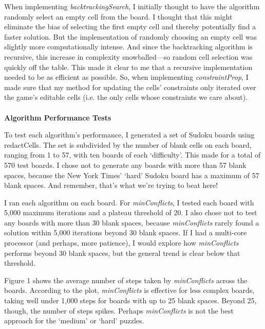 \documentclass[12pt]{article}
\begin{document}
	When implementing \textit{backtrackingSearch}, I initially thought to have the algorithm randomly select an empty cell from the board. I thought that this might eliminate the bias of selecting the first empty cell and thereby potentially find a faster solution. But the implementation of randomly choosing an empty cell was slightly more computationally intense. And since the backtracking algorithm is recursive, this increase in complexity snowballed---so random cell selection was quickly off the table. This made it clear to me that a recursive implementation needed to be as efficient as possible. So, when implementing \textit{constraintProp}, I made sure that my method for updating the cells' constraints only iterated over the game's editable cells (i.e. the only cells whose constraints we care about).\\\\
\textbf{Algorithm Performance Tests}
	
	To test each algorithm's performance, I generated a set of Sudoku boards using redactCells. The set is subdivided by the number of blank cells on each board, ranging from 1 to 57, with ten boards of each `difficulty'. This made for a total of 570 test boards. I chose not to generate any boards with more than 57 blank spaces, because the New York Times' `hard' Sudoku board has a maximum of 57 blank spaces. And remember, that's what we're trying to beat here!
	
	I ran each algorithm on each board. For \textit{minConflicts}, I tested each board with 5,000 maximum iterations and a plateau threshold of 20. I also chose not to test any boards with more than 30 blank spaces, because \textit{minConflicts} rarely found a solution within 5,000 iterations beyond 30 blank spaces. If I had a multi-core processor (and perhaps, more patience), I would explore how \textit{minConflicts} performs beyond 30 blank spaces, but the general trend is clear below that threshold.
	
	Figure 1 shows the average number of steps taken by \textit{minConflicts} across the boards. According to the plot, \textit{minConflicts} is effective for less complex boards, taking well under 1,000 steps for boards with up to 25 blank spaces. Beyond 25, though, the number of steps spikes. Perhaps \textit{minConflicts} is not the best approach for the `medium' or `hard' puzzles.
	
\end{document}
